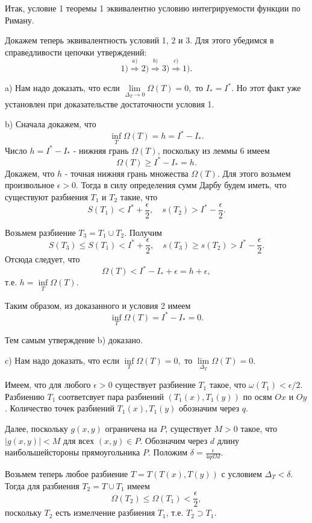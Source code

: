 \par\parindent=1cm Итак, условие 1 теоремы 1 эквивалентно условию интегрируемости функции по Риману.
\par\parindent=1cm Докажем теперь эквивалентность условий 1, 2 и 3. Для этого убедимся в справедливости цепочки утверждений: $$1)\stackrel{a)}\Rightarrow 2)\stackrel{b)}\Rightarrow 3)\stackrel{c)}\Rightarrow 1).$$
\par\parindent=1cm a) Нам надо доказать, что если $\lim\limits_{\Delta_T\to 0}{\Omega(T)}=0,$ то $I_*=I^*.$ Но этот факт уже установлен при доказательстве достаточности условия 1.
\par\parindent=1cm b) Сначала докажем, что $$\inf\limits_T{\Omega(T)}=h=I^*-I_*.$$ Число $h=I^*-I_*$ - нижняя грань $\Omega(T)$, поскольку из леммы 6 имеем $$\Omega(T)\ge I^*-I_*=h.$$ Докажем, что $h$ - точная нижняя грань множества {$\Omega(T)$}. Для этого возьмем произвольное $\epsilon>0$. Тогда в силу определения сумм Дарбу будем иметь, что существуют разбиения $T_1$ и $T_2$ такие, что $$S(T_1)<I^*+\frac{\epsilon}{2},\quad s(T_2)>I^*-\frac{\epsilon}{2}.$$
\par\parindent=1cm Возьмем разбиение $T_3=T_1\cup T_2$. Получим $$S(T_3)\le S(T_1)<I^*+\frac{\epsilon}{2},\quad s(T_3)\ge s(T_2)>I^*-\frac{\epsilon}{2}.$$ Отсюда следует, что $$\Omega(T)<I^*-I_*+\epsilon=h+\epsilon,$$ т.е. $h=\inf\limits_{T}{\Omega(T)}.$
\par\parindent=1cm Таким образом, из доказанного и условия 2 имеем $$\inf\limits_T{\Omega(T)}=I^*-I_*=0.$$
\par\parindent=1cm Тем самым утверждение b) доказано.
\par\parindent=1cm c) Нам надо доказать, что если $\inf\limits_T{\Omega(T)}=0,$ то $\lim\limits_{\Delta_T}{\Omega(T)}=0.$
\par\parindent=1cm Имеем, что для любого $\epsilon>0$ существует разбиение $T_1$ такое, что $\omega(T_1)<\epsilon/2.$ Разбиению $T_1$ соответсвует пара разбиений $(T_1(x), T_1(y))$ по осям $Ox$ и $Oy$. Количество точек разбиений $T_1(x), T_1(y)$ обозначим через $q$.
\par\parindent=1cm Далее, поскольку $g(x, y)$ ограничена на $P$, существует $M>0$ такое, что 
\\$|g(x, y)|<M$ для всех $(x, y)\in P$. Обозначим через $d$ длину наибольшейстороны прямоугольника $P$. Положим $\delta=\frac{\epsilon}{4qdM}.$
\par\parindent=1cm Возьмем теперь любое разбиение $T=T(T(x), T(y))$ с условием $\Delta_T<\delta.$ Тогда для разбиения $T_2=T\cup T_1$ имеем $$\Omega(T_2)\le \Omega(T_1)<\frac{\epsilon}{2},$$ поскольку $T_2$ есть измелчение разбиения $T_1$, т.е. $T_2\supset T_1$.
